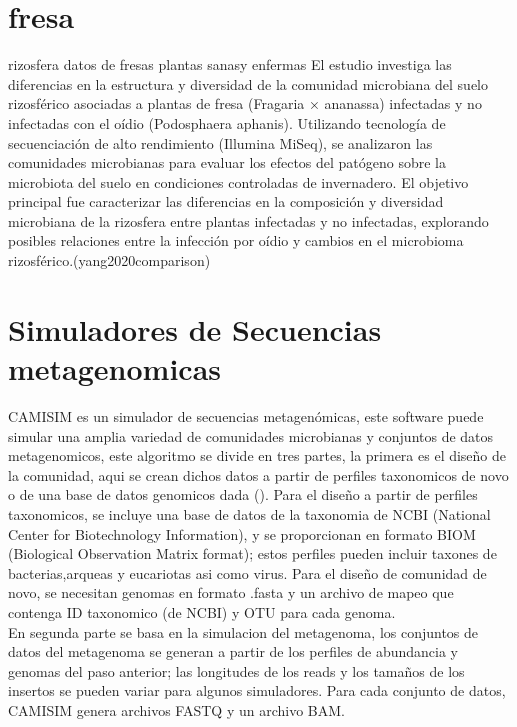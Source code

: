 \section{fresa}

rizosfera 
datos de fresas 
plantas sanasy enfermas 
El estudio investiga las diferencias en la estructura y diversidad de la comunidad microbiana del suelo rizosférico asociadas a plantas de fresa (Fragaria × ananassa) infectadas y no infectadas con el oídio (Podosphaera aphanis). Utilizando tecnología de secuenciación de alto rendimiento (Illumina MiSeq), se analizaron las comunidades microbianas para evaluar los efectos del patógeno sobre la microbiota del suelo en condiciones controladas de invernadero. El objetivo principal fue caracterizar las diferencias en la composición y diversidad microbiana de la rizosfera entre plantas infectadas y no infectadas, explorando posibles relaciones entre la infección por oídio y cambios en el microbioma rizosférico.(yang2020comparison)\\


\section{Simuladores de Secuencias metagenomicas}

CAMISIM es un simulador de secuencias metagenómicas, este software puede simular una amplia variedad de comunidades microbianas y conjuntos de datos metagenomicos, este algoritmo se divide en tres partes, la primera es el diseño de la comunidad, aqui se crean dichos datos a partir de perfiles taxonomicos de novo o de una base de datos genomicos dada (\cite{fritz2019camisim}). Para el diseño a partir de perfiles taxonomicos, se incluye una base de datos de la taxonomia de NCBI (National Center for Biotechnology Information), y se proporcionan en formato BIOM (Biological Observation Matrix format); estos perfiles pueden incluir taxones de bacterias,arqueas y eucariotas asi como virus. Para el diseño de comunidad de novo, se necesitan genomas en formato .fasta y un archivo de mapeo que contenga ID taxonomico (de NCBI) y OTU para cada genoma.  \\

En segunda parte se basa en la simulacion del metagenoma, los conjuntos de datos del metagenoma se generan a partir de los perfiles de abundancia y genomas del paso anterior; las longitudes de los reads y los tamaños de los insertos se pueden variar para algunos simuladores. Para cada conjunto de datos, CAMISIM genera archivos FASTQ y un archivo BAM.  \\

